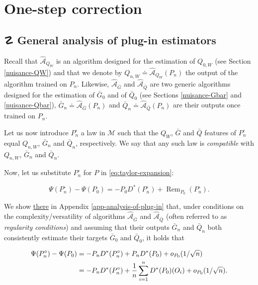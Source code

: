 \documentclass[
  11pt,
  openright,twoside]{book}
\DeclareMathOperator{\Rem}{Rem}
\DeclareRobustCommand{\stixdanger}{%
  {\usefont{U}{stixbbit}{m}{it}\symbol{"F6}}%
}
\newcommand{\Algo}{\widehat{\mathcal{A}}}
\newcommand{\defq}{\doteq}
\newcommand{\calM}{\mathcal{M}}
\newcommand{\Gbar}{\bar{G}}
\newcommand{\Phat}{P^{\circ}}
\newcommand{\Qbar}{\bar{Q}}
\theoremstyle{definition}
\theoremstyle{definition}
\theoremstyle{definition}
\theoremstyle{definition}
\theoremstyle{remark}
\begin{document}
\hypertarget{one-step}{%
\chapter{One-step correction}\label{one-step}}

\hypertarget{analysis-of-plug-in}{%
\section{\texorpdfstring{☡ \stixdanger{} General analysis of plug-in estimators}{☡  General analysis of plug-in estimators}}\label{analysis-of-plug-in}}

Recall that \(\Algo_{Q_{W}}\) is an algorithm designed for the estimation of
\(Q_{0,W}\) (see Section \ref{nuisance-QW}) and that we denote by \(Q_{n,W} \defq \Algo_{Q_{W}}(P_{n})\) the output of the algorithm trained on \(P_{n}\).
Likewise, \(\Algo_{\Gbar}\) and \(\Algo_{\Qbar}\) are two generic algorithms
designed for the estimation of \(\Gbar_{0}\) and of \(\Qbar_{0}\) (see Sections
\ref{nuisance-Gbar} and \ref{nuisance-Qbar}), \(\Gbar_{n} \defq \Algo_{\Gbar}(P_{n})\) and \(\Qbar_{n} \defq \Algo_{\Qbar}(P_{n})\) are their
outputs once trained on \(P_{n}\).

Let us now introduce \(\Phat_n\) a law in \(\calM\) such that the \(Q_{W}\), \(\Gbar\)
and \(\Qbar\) features of \(\Phat_n\) equal \(Q_{n,W}\), \(\Gbar_{n}\) and
\(\Qbar_{n}\), respectively. We say that any such law is \emph{compatible} with
\(Q_{n,W}\), \(\Gbar_n\) and \(\Qbar_n\).

Now, let us substitute \(\Phat_n\) for \(P\) in \eqref{eq:taylor-expansion}:

\begin{equation} 
\label{eq:hard-to-study}  \Psi(\Phat_n)  -  \Psi(P_0)   =  -  P_0  D^*(\Phat_n)  +
\Rem_{P_0}(\Phat_n) . 
\end{equation}

We show \protect\hyperlink{app-analysis-of-plug-in}{there} in Appendix
\ref{app-analysis-of-plug-in} that, under conditions on the
complexity/versatility of algorithms \(\Algo_{\Gbar}\) and \(\Algo_{\Qbar}\)
(often referred to as \emph{regularity conditions}) and assuming that their outputs
\(\Gbar_{n}\) and \(\Qbar_{n}\) both consistently estimate their targets
\(\Gbar_{0}\) and \(\Qbar_{0}\), it holds that

\begin{align} 
\Psi(\Phat_n) - \Psi(P_0) &= - P_{n} D^*(\Phat_n) +
 P_{n} D^*(P_0) + 
o_{P_0}(1/\sqrt{n}) \label{eq:pre-one-step} \\ 
\notag &= - P_{n} D^*(\Phat_n)+ \frac{1}{n} \sum_{i=1}^n D^*(P_0)(O_i)  + o_{P_0}(1/\sqrt{n}). 
\end{align}
\end{document}
